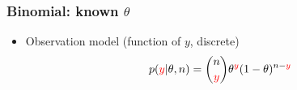 \documentclass[10pt]{beamer}
\begin{document}
\begin{frame}
  \frametitle{Binomial: known $\theta$}

  \begin{itemize}
  \item {\color{blue}Observation model} (function of {\color{red} $y$}, discrete)
    \begin{align*}
      p({\color{red}y}|\theta,n) = \binom{n}{{\color{red}y}} \theta^{\color{red}y}(1-\theta)^{n-{\color{red}y}}
    \end{align*}
  \end{itemize}

  \begin{center}
\end{center}
\end{frame}
\end{document}
